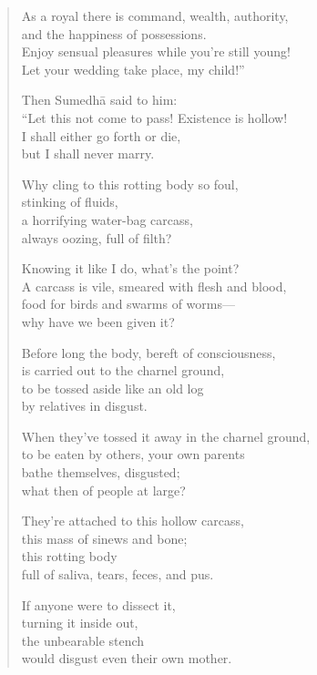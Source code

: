 \documentclass[12pt,openany]{book}%
\begin{document}
\begin{verse}
As a royal there is command, wealth, authority, \\
and the happiness of possessions. \\
Enjoy sensual pleasures while you’re still young! \\
Let your wedding take place, my child!” 

Then \textsanskrit{Sumedhā} said to him: \\
“Let this not come to pass! Existence is hollow! \\
I shall either go forth or die, \\
but I shall never marry. 

Why cling to this rotting body so foul, \\
stinking of fluids, \\
a horrifying water-bag carcass, \\
always oozing, full of filth? 

Knowing it like I do, what’s the point? \\
A carcass is vile, smeared with flesh and blood, \\
food for birds and swarms of worms—\\
why have we been given it? 

Before long the body, bereft of consciousness, \\
is carried out to the charnel ground, \\
to be tossed aside like an old log \\
by relatives in disgust. 

When they’ve tossed it away in the charnel ground, \\
to be eaten by others, your own parents \\
bathe themselves, disgusted; \\
what then of people at large? 

They’re attached to this hollow carcass, \\
this mass of sinews and bone; \\
this rotting body \\
full of saliva, tears, feces, and pus. 

If anyone were to dissect it, \\
turning it inside out, \\
the unbearable stench \\
would disgust even their own mother. 


\end{verse}
\end{document}
